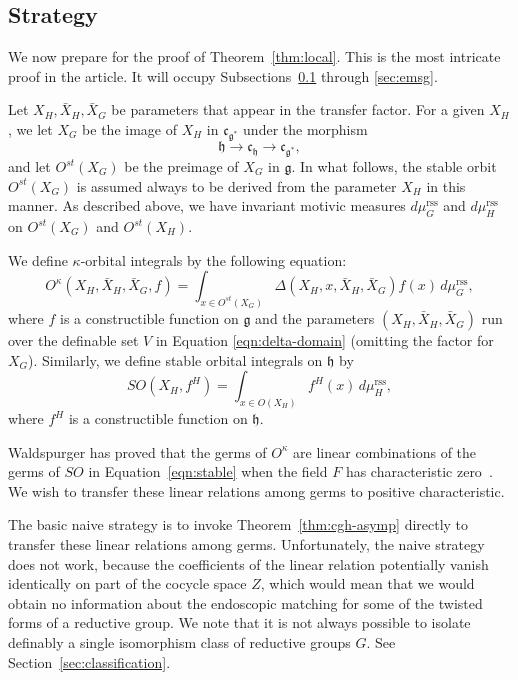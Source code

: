 \documentclass[12pt]{amsart}
\newcommand{\fg}{\mathfrak{g}}
\newcommand{\fc}{\mathfrak{c}}
\newcommand{\fh}{\mathfrak{h}}
\newcommand{\reg}{\mathrm{rss}}
\theoremstyle{plain}
\theoremstyle{definition}
\begin{document}
\subsection{Strategy}\label{sec:strategy}

We now prepare for the proof of Theorem~\ref{thm:local}.  This is the
most intricate proof in the article.  It will occupy
Subsections~\ref{sec:strategy} through \ref{sec:emsg}.

Let $X_H,\bar X_H,\bar X_G$ be parameters that appear in the
transfer factor.  For a given $X_H$, we let $X_G$ be the image of $X_H$ in
$\fc_{\fg^*}$ under the morphism
\[
\fh \to \fc_{\fh} \to \fc_{\fg^*},
\]
and let $O^{st}(X_G)$ be the preimage of $X_G$ in $\fg$.  In what
follows, the stable orbit $O^{st}(X_G)$ is assumed always to be
derived from the parameter $X_H$ in this manner.  As described above,
we have invariant motivic measures $d\mu^\reg_G$ and $d\mu^\reg_H$ on
$O^{st}(X_G)$ and $O^{st}(X_H)$.

We define $\kappa$-orbital integrals by the following equation:
\begin{equation}\label{eqn:kappa}
O^\kappa(X_H,\bar X_H,\bar X_G,f) = \int_{x\in O^{st}(X_G)}
\Delta(X_H,x,\bar X_H,\bar X_G) f (x)\,d\mu^\reg_G,
\end{equation}
where $f$ is a constructible function on $\fg$ and the parameters
$(X_H,\bar X_H,\bar X_G)$ run over the definable set $V$ in Equation
\ref{eqn:delta-domain} (omitting the factor for $X_G$).  Similarly, we
define stable orbital integrals on $\fh$ by
\begin{equation}\label{eqn:stable}
SO(X_H,f^H) = \int_{x\in O(X_H)} f^H (x)\,d\mu^\reg_H,
\end{equation}
where $f^H$ is a constructible function on $\fh$.

Waldspurger has proved that the germs of $O^\kappa$ are linear
combinations of the germs of $SO$ in Equation~\ref{eqn:stable} when
the field $F$ has characteristic zero~\cite{waldspurger1997lemme}.  We
wish to transfer these linear relations among germs to positive
characteristic.

The basic naive strategy is to invoke Theorem~\ref{thm:cgh-asymp}
directly to transfer these linear relations among germs.
Unfortunately, the naive strategy does not work, because the
coefficients of the linear relation potentially vanish identically on
part of the cocycle space $Z$, which would mean that we would obtain
no information about the endoscopic matching for some of the twisted
forms of a reductive group.  We note that it is not always possible to
isolate definably a single isomorphism class of reductive groups $G$.
See Section~\ref{sec:classification}.
\end{document}
